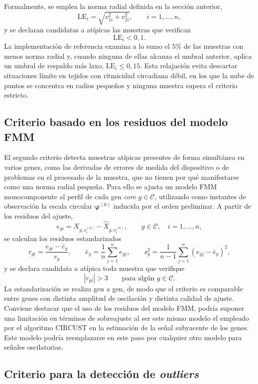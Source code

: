\documentclass[12pt, a4paper]{report}
\begin{document}
Formalmente, se emplea la norma radial definida en la sección anterior,
\[
\mathrm{LE}_i=\sqrt{v_{1i}^{2}+v_{2i}^{2}},
\qquad i=1,\ldots,n ,
\]
y se declaran candidatas a atípicas las muestras que verifican
\[
\mathrm{LE}_i<0{,}1 .
\]
La implementación de referencia examina a lo sumo el \(5\%\) de las muestras con menos norma radial y, cuando ninguna de ellas alcanza el umbral anterior, aplica un umbral de respaldo más laxo, \(\mathrm{LE}_i\leq 0{,}15\). Esta relajación evita descartar situaciones límite en tejidos con ritmicidad circadiana débil, en los que la nube de puntos se concentra en radios pequeños y ninguna muestra supera el criterio estricto.

\subsection{Criterio basado en los residuos del modelo FMM}

El segundo criterio detecta muestras atípicas presentes de forma simultánea en varios genes, como las derivadas de errores de medida del dispositivo o de problemas en el procesado de la muestra, que no tienen por qué manifestarse como una norma radial pequeña. Para ello se ajusta un modelo FMM monocomponente al perfil de cada gen \textit{core} \(g\in\mathcal{C}\), utilizando como instantes de observación la escala circular \(\boldsymbol{\varphi}^{(0)}\) inducida por el orden preliminar. A partir de los residuos del ajuste,
\[
e_{gi}=X_{g,o^{(0)}_i}-\widehat{X}_{g,o^{(0)}_i},
\qquad g\in\mathcal{C},\quad i=1,\ldots,n ,
\]
se calculan los residuos estandarizados
\[
r_{gi}=\frac{e_{gi}-\bar{e}_{g}}{s_{g}},
\qquad
\bar{e}_{g}=\frac{1}{n}\sum_{j=1}^{n}e_{gj},
\qquad
s_{g}^{2}=\frac{1}{n-1}\sum_{j=1}^{n}\left(e_{gj}-\bar{e}_{g}\right)^{2},
\]
y se declara candidata a atípica toda muestra que verifique
\[
\left|r_{gi}\right|>3
\qquad\text{para algún } g\in\mathcal{C} .
\]
La estandarización se realiza gen a gen, de modo que el criterio es comparable entre genes con distinta amplitud de oscilación y distinta calidad de ajuste. Conviene destacar que el uso de los residuos del modelo FMM,  podría suponer una limitación en términos de sobreajuste al ser este mismo modelo el empleado por el algoritmo CIRCUST en la estimación de la señal subyacente de los genes. Este modelo podría reemplazarse en este paso por cualquier otro modelo para señales oscilatorias.

\subsection{Criterio para la detección de \textit{outliers}}
\end{document}
